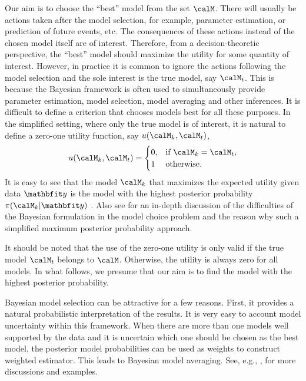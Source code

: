 Our aim is to choose the ``best'' model from the set $\calM$. There will usually be actions taken after the model selection, for example, parameter estimation, or prediction of future events, etc. The consequences of these actions instead of the chosen model itself are of interest. Therefore, from a decision-theoretic perspective, the ``best'' model should maximize the utility for some quantity of interest. However, in practice it is common to ignore the actions following the model selection and the sole interest is the true model, say $\calM_t$. This is because the Bayesian framework is often used to simultaneously provide parameter estimation, model selection, model averaging and other inferences. It is difficult to define a criterion that chooses models best for all these purposes. In the simplified setting, where only the true model is of interest, it is natural to define a zero-one utility function, say $u(\calM_k,\calM_t)$,
\begin{equation}
  u(\calM_k,\calM_t) =
  \begin{cases}
    0, &\text{if } \calM_k = \calM_t,\\
    1  &\text{otherwise.}
  \end{cases}
\end{equation}
It is easy to see that the model $\calM_k$ that maximizes the expected utility given data $\data$ is the model with the highest posterior probability $\pi(\calM_k|\data)$ \cite[][chap.~6]{Bernardo:1994vd}. Also see \cite[][sec.~7.2.1]{Robert:2007tc} for an in-depth discussion of the difficulties of the Bayesian formulation in the model choice problem and the reason why such a simplified maximum posterior probability approach.

It should be noted that the use of the zero-one utility is only valid if the true model $\calM_t$ belongs to $\calM$. Otherwise, the utility is always zero for all models. In what follows, we presume that our aim is to find the model with the highest posterior probability.

Bayesian model selection can be attractive for a few reasons. First, it provides a natural probabilistic interpretation of the results. It is very easy to account model uncertainty within this framework. When there are more than one models well supported by the data and it is uncertain which one should be chosen as the best model, the posterior model probabilities can be used as weights to construct weighted estimator. This leads to Bayesian model averaging. See, e.g., \cite{Raftery:1997vx,Clyde:1999vx,Draper:1995vx}, for more discussions and examples.

